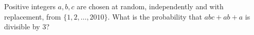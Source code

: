 Positive integers $a,b,c$ are chosen at random, independently and with replacement, from $\{1,2,\dots,2010\}$. What is the probability that $abc+ab+a$ is divisible by $3$?
